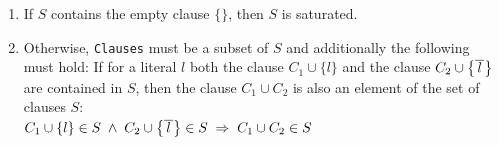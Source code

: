 \begin{enumerate}
\item If $S$ contains the empty clause $\{\}$, then $S$ is saturated.
\item Otherwise, \texttt{Clauses} must be a subset of $S$ and additionally the following must hold:
      If for a literal $l$ both the clause $C_1 \cup \{ l \}$ and the clause $C_2 \cup
      \bigl\{ \overline{\,l\,} \bigr\}$ are contained in $S$,
      then the clause $C_1 \cup C_2$ is also an element of the set of clauses $S$:
      \\[0.2cm]
      \hspace*{1.3cm}
      $C_1 \cup \{ l \} \in S \;\wedge\; C_2 \cup \bigl\{ \overline{\,l\,} \bigr\} \in S \;\Rightarrow\; C_1 \cup C_2 \in S$
\end{enumerate}

